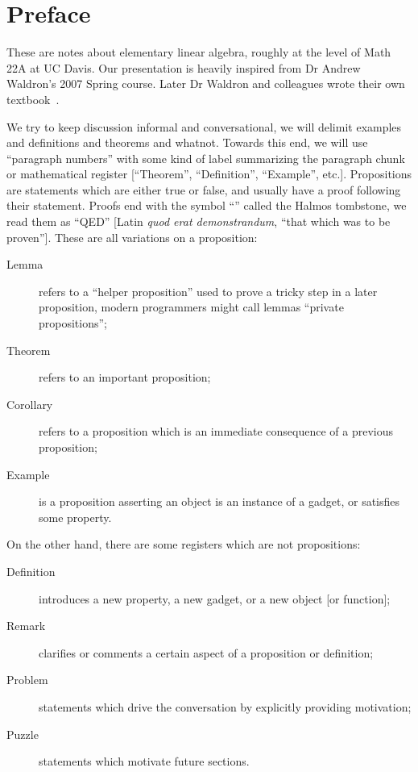 \section*{Preface}

These are notes about elementary linear algebra, roughly at the level of
Math 22A at UC Davis. Our presentation is heavily inspired from Dr
Andrew Waldron's 2007 Spring course. Later Dr Waldron and colleagues
wrote their own textbook~\cite{waldron}.

We try to keep discussion informal and conversational, we will delimit
examples and definitions and theorems and whatnot. Towards this end, we
will use ``paragraph numbers'' with some kind of label summarizing the
paragraph chunk or mathematical register [``Theorem'', ``Definition'',
``Example'', etc.]. Propositions are statements which are either true or
false, and usually have a proof following their statement. Proofs end
with the symbol ``\qedsymbol'' called the Halmos tombstone, we read them
as ``QED'' [Latin \textit{quod erat demonstrandum}, ``that which was to
be proven'']. These are all variations on a proposition: 
\begin{description}
\item[Lemma] refers to a ``helper proposition'' used to prove a tricky
step in a later proposition, modern programmers might call lemmas
``private propositions'';
\item[Theorem] refers to an important proposition;
\item[Corollary] refers to a proposition which is an immediate
consequence of a previous proposition;
\item[Example] is a proposition asserting an object is an instance of a
gadget, or satisfies some property.
\end{description}
\medbreak\noindent%
On the other hand, there are some registers which are not propositions:
\medbreak
\begin{description}
\item[Definition] introduces a new property, a new gadget, or a new
object [or function];
\item[Remark] clarifies or comments a certain aspect of a proposition or definition;
\item[Problem] statements which drive the conversation by explicitly
providing motivation;
\item[Puzzle] statements which motivate future sections.
\end{description}

